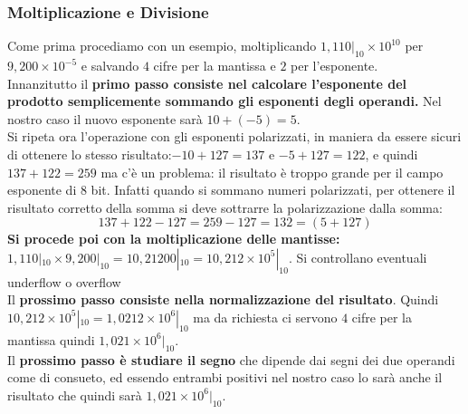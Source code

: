 \documentclass[a4paper,12pt, oneside]{book}
\begin{document}
\subsubsection{Moltiplicazione e Divisione}
Come prima procediamo con un esempio, moltiplicando $1,110|_{10}\times 10^{10}$ per $9,200 \times 10^{-5}$ e salvando $4$ cifre per la mantissa e $2$ per l'esponente.\\
Innanzitutto il \textbf{primo passo consiste nel calcolare l'esponente del
  prodotto semplicemente sommando gli esponenti degli operandi.} Nel nostro caso il nuovo esponente sarà $10 + (-5) = 5$.\\
Si ripeta ora l'operazione con gli esponenti polarizzati, in maniera da
essere sicuri di ottenere lo stesso risultato:$-10+127=137$ e $-5+127=122$, e
quindi $137+122=259$ ma c'è un problema: il risultato è troppo grande per il campo esponente di 8 bit. Infatti quando si sommano numeri polarizzati, per ottenere il risultato corretto
della somma si deve sottrarre la polarizzazione dalla somma:
\[137 + 122 - 127 = 259 - 127 = 132 = (5+ 127)\]
\textbf{Si procede poi con la moltiplicazione delle mantisse:} $1,110|_{10}\times 9,200|_{10} = 10,21200|_{10} = 10,212\times 10^5 |_{10}$. Si controllano eventuali underflow o overflow\\
Il \textbf{prossimo passo consiste nella normalizzazione del risultato}. Quindi $10,212\times 10^5 |_{10} = 1,0212\times 10^6 |_{10}$ ma da richiesta ci servono $4$ cifre per la mantissa quindi $1,021\times 10^6 |_{10}$.\\
Il \textbf{prossimo passo è studiare il segno} che dipende dai segni dei due operandi come di consueto, ed essendo entrambi positivi nel nostro caso lo sarà anche il risultato che quindi sarà  $1,021\times 10^6 |_{10}$.\\
\end{document}
